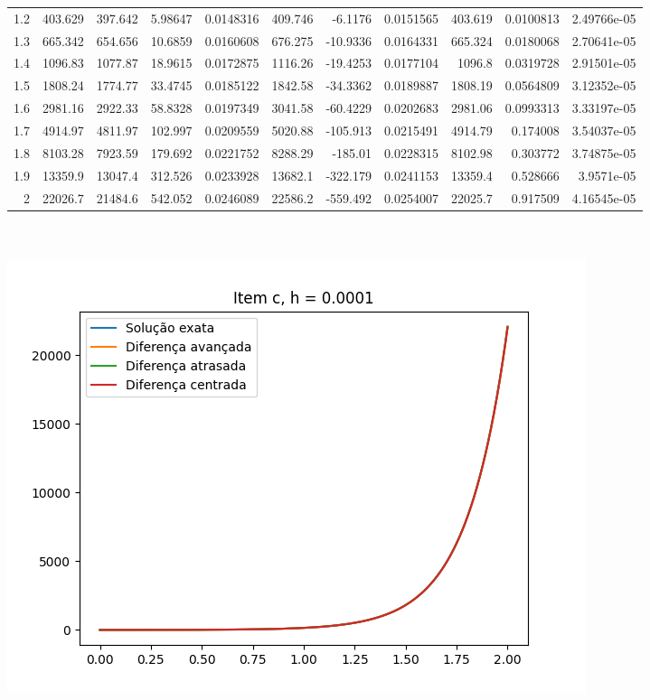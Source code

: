 {\begin{tabular}{rrrrrrrrrrr}
 1.2 &   403.629   &   397.642   &    5.98647    &    0.0148316  &   409.746   &   -6.1176     &    0.0151565  &   403.619   &   0.0100813   &   2.49766e-05 \\
 1.3 &   665.342   &   654.656   &   10.6859     &    0.0160608  &   676.275   &  -10.9336     &    0.0164331  &   665.324   &   0.0180068   &   2.70641e-05 \\
 1.4 &  1096.83    &  1077.87    &   18.9615     &    0.0172875  &  1116.26    &  -19.4253     &    0.0177104  &  1096.8     &   0.0319728   &   2.91501e-05 \\
 1.5 &  1808.24    &  1774.77    &   33.4745     &    0.0185122  &  1842.58    &  -34.3362     &    0.0189887  &  1808.19    &   0.0564809   &   3.12352e-05 \\
 1.6 &  2981.16    &  2922.33    &   58.8328     &    0.0197349  &  3041.58    &  -60.4229     &    0.0202683  &  2981.06    &   0.0993313   &   3.33197e-05 \\
 1.7 &  4914.97    &  4811.97    &  102.997      &    0.0209559  &  5020.88    & -105.913      &    0.0215491  &  4914.79    &   0.174008    &   3.54037e-05 \\
 1.8 &  8103.28    &  7923.59    &  179.692      &    0.0221752  &  8288.29    & -185.01       &    0.0228315  &  8102.98    &   0.303772    &   3.74875e-05 \\
 1.9 & 13359.9     & 13047.4     &  312.526      &    0.0233928  & 13682.1     & -322.179      &    0.0241153  & 13359.4     &   0.528666    &   3.9571e-05  \\
 2   & 22026.7     & 21484.6     &  542.052      &    0.0246089  & 22586.2     & -559.492      &    0.0254007  & 22025.7     &   0.917509    &   4.16545e-05 \\
\hline
\end{tabular}
}
        \\
        \\
        \includegraphics{c_h_0.0001.png}
